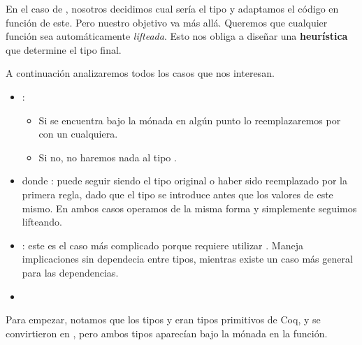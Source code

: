 En el caso de , nosotros decidimos cual sería el tipo y adaptamos el
código en función de este. Pero nuestro objetivo va más allá. Queremos que
cualquier función sea automáticamente \textit{lifteada}. Esto nos obliga a
diseñar una \textbf{heurística} que determine el tipo final.

A continuación analizaremos todos los casos que nos interesan.
\begin{itemize}
\item {}:
  \begin{itemize}
    \item Si  se encuentra bajo la mónada en algún punto lo
      reemplazaremos por  con  un 
      cualquiera.
    \item Si no, no haremos nada al tipo .
  \end{itemize}
\item {} donde :  puede seguir siendo el
  tipo original o haber sido reemplazado por la primera regla, dado que el tipo
  se introduce antes que los valores de este mismo. En ambos casos operamos de
  la misma forma y simplemente seguimos lifteando.
\item {}: este es el caso más complicado porque requiere utilizar
  . Maneja implicaciones sin dependecia entre tipos, mientras
  existe un caso más general para las dependencias.

\item 
\end{itemize}

Para empezar, notamos que los tipos  y  eran tipos primitivos de
Coq, y se convirtieron en , pero ambos tipos aparecían bajo la
mónada en la función.